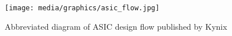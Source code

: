 
\begin{figure}[t]
    \centering
    \texttt{[image: media/graphics/asic\_flow.jpg]}
    \caption{Abbreviated diagram of ASIC design flow published by Kynix \cite{kynixDesignFlow}}
    \label{fig:asic_flow}
\end{figure}
